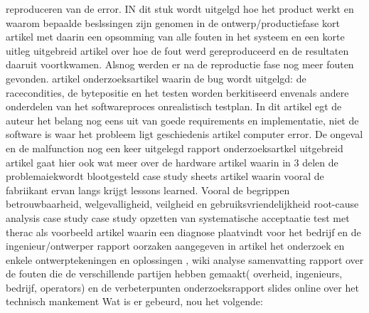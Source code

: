 \begin{description}
	reproduceren van de error. IN dit stuk wordt uitgelgd hoe het product werkt en waarom bepaalde beslssingen zijn genomen in de ontwerp/productiefase
	\cite{lynch2017theracRaceConditions}
	kort artikel met daarin een opsomming van alle fouten in het systeem en een korte uitleg
	\cite{lim1998theracdisaster}
	uitgebreid artikel over hoe de fout werd gereproduceerd en de resultaten daaruit voortkwamen. Alsnog werden er na de reproductie fase nog meer fouten gevonden.
	\cite{fabio26102015therac25}
	artikel
	\cite{ethicsunwrappedTherac25}
	onderzoeksartikel waarin de bug wordt uitgelgd: de racecondities, de bytepositie en het testen worden berkitiseerd envenals andere onderdelen van het softwareproces
	onrealistisch testplan. In dit artikel egt de auteur het belang nog eens uit van goede requirements en implementatie, niet de software is waar het probleem ligt
	geschiedenis
	\cite{casesHistoryTherac25}
	artikel
	\cite{caballero2019Therac25}
	computer error. De ongeval en de malfunction nog een keer uitgelegd
	\cite{rose1994theracFatalDose}
	rapport
	\cite{levesonMITTherac25}
	\cite{grant1978theracevaluation}
	onderzoeksartkel
	\cite{turnerTheracAccidentsInvestigations}
	\cite{turner1993TheracAccidentsInvestigations}
	uitgebreid artikel gaat hier ook wat meer over de hardware
	\cite{wang2017industrialdesignengineering}
	artikel waarin in 3 delen de problemaiekwordt blootgesteld
	\cite{levesonturner1993theracpart2}
	case study sheets
	artikel waarin vooral de fabriikant ervan langs krijgt
	\cite{porelloTheraccFailure}
	lessons learned. Vooral de begrippen betrouwbaarheid, welgevalligheid, veilgheid en gebruiksvriendelijkheid
	\cite{theracIncidents}
	root-cause analysis
	case study
	\cite{huffbrown2004casestudyethicatherac}
	case study
	\cite{sebowikimedicalradiation}
	opzetten van systematische acceptaatie test met therac als voorbeeld
	\cite{hsia1995testtherac25}
	artikel waarin een diagnose plaatvindt voor het bedrijf en de ingenieur/ontwerper
	\cite{magsilvaTheracTesting}
	rapport
	oorzaken aangegeven in artikel
	\cite{chemeuropetherac25}
	het onderzoek en enkele ontwerptekeningen en oplossingen
	\cite{statsenko10102016Therackillerbug}
	\cite{therac25casestudy}
	\cite{thomas1994theracinLotos},
	\cite{twitter2019programmerbehindtherac}
	wiki
	\cite{wikibookstherac}
	analyse
	\cite{bozdagTherac25}
	samenvatting
	\cite{levesonTurnerTheracAbstract}
	rapport over de fouten die de verschillende partijen hebben gemaakt( overheid, ingenieurs, bedrijf, operators) en de verbeterpunten
	onderzoeksrapport
	slides online over het technisch mankement
	Wat is er gebeurd, nou het volgende:

\end{description}
